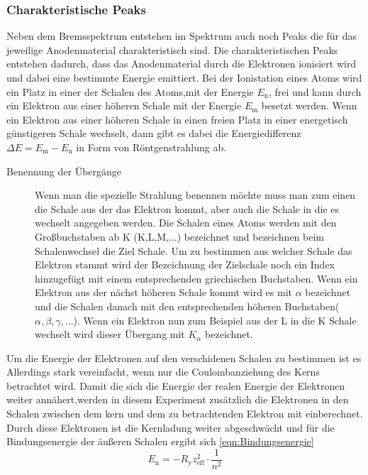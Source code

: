 \subsubsection{Charakteristische Peaks}
Neben dem Bremsspektrum entstehen im Spektrum auch noch Peaks die für das jeweilige Anodenmaterial charakteristisch sind.
Die charakteristischen Peaks entstehen dadurch, dass das Anodenmaterial durch die Elektronen ionisiert wird und dabei eine bestimmte Energie emittiert.
Bei der Ionistation eines Atoms wird ein Platz in einer der Schalen des Atoms,mit der Energie $E_{\text{n}}$, frei und kann durch ein Elektron aus einer höheren Schale mit der Energie $E_{\text{m}}$ besetzt werden.
Wenn ein Elektron aus einer höheren Schale in einen freien Platz in einer energetisch günstigeren Schale wechselt, dann gibt es dabei die Energiedifferenz $\Delta E = E_{\text{m}} -E_{\text{n}}$ in Form von Röntgenstrahlung ab.
\begin{description}
    \item[Benennung der Übergänge]
    Wenn man die spezielle Strahlung benennen möchte muss man zum einen die Schale aus der das Elektron kommt, aber auch die Schale in die es wechselt angegeben werden.
    Die Schalen eines Atoms werden mit den Großbuchstaben ab K (K,L,M,...) bezeichnet und bezeichnen beim Schalenwechsel die Ziel Schale.
    Um zu bestimmen aus welcher Schale das Elektron stammt wird der Bezeichnung der Zielschale noch ein Index hinzugefügt mit einem entsprechenden griechischen Buchstaben.
    Wenn ein Elektron aus der nächst höheren Schale kommt wird es mit $\alpha$ bezeichnet und die Schalen danach mit den entsprechenden höheren Buchstaben($\alpha,\beta,\gamma,...$).
    Wenn ein Elektron nun zum Beispiel aus der L in die K Schale wechselt wird dieser Übergang mit $K_{\alpha}$ bezeichnet.
\end{description}
Um die Energie der Elektronen auf den verschidenen Schalen zu bestimmen ist es Allerdings stark vereinfacht, wenn nur die Coulombanziehung des Kerns betrachtet wird.
Damit die sich die Energie der realen Energie der Elektronen weiter annähert,werden in diesem Experiment zusätzlich die Elektronen in den Schalen zwischen dem kern und dem zu betrachtenden Elektron mit einberechnet.
Durch diese Elektronen ist die Kernladung weiter abgeschwächt und für die Bindungsenergie der äußeren Schalen ergibt sich \ref{eqn:Bindungsenergie}
\begin{equation}
    E_{\text{n}} = -R_{\text{y}} z_{\text{eff}}^2 \cdot \frac{1}{n^2} \label{eqn:Bindungsenergie}
\end{equation}

